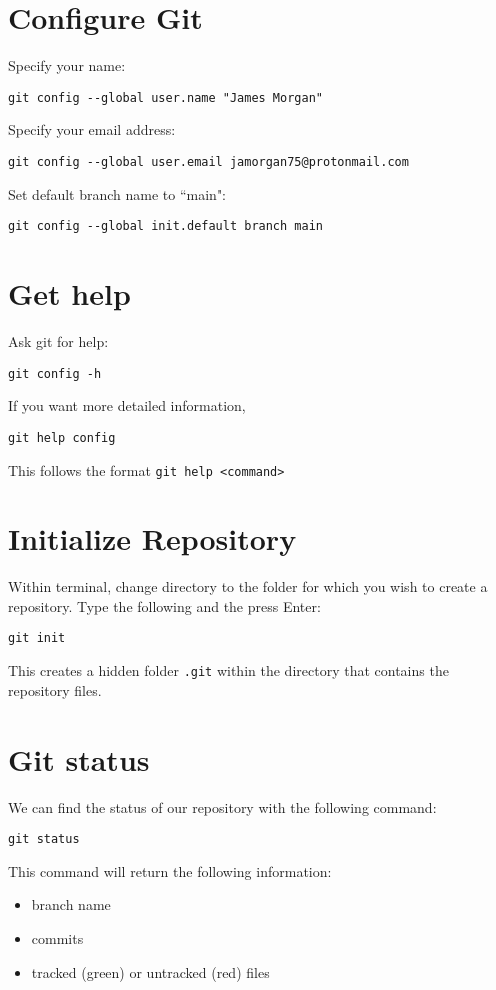 \documentclass[12pt]{article}
\begin{document}
\section{Configure Git}
Specify your name:
\begin{Verbatim}
git config --global user.name "James Morgan"
\end{Verbatim}
Specify your email address:
\begin{Verbatim}
git config --global user.email jamorgan75@protonmail.com
\end{Verbatim}
Set default branch name to ``main":
\begin{Verbatim}
git config --global init.default branch main
\end{Verbatim}

\section{Get help}
Ask git for help:
\begin{Verbatim}
git config -h
\end{Verbatim}
If you want more detailed information,
\begin{Verbatim}
git help config
\end{Verbatim}
This follows the format \verb|git help <command>|





\section{Initialize Repository}
Within terminal, change directory to the folder for which you wish to create a repository. Type the following and the press Enter:
\begin{Verbatim}
git init
\end{Verbatim}
This creates a hidden folder \verb|.git| within the directory that contains the repository files.\par






\newpage






\section{Git status}
We can find the status of our repository with the following command:
\begin{Verbatim}
git status
\end{Verbatim}
This command will return the following information:
\begin{itemize}[nosep]
\item branch name
\item commits
\item tracked (green) or untracked (red) files
\end{itemize}
\end{document}
